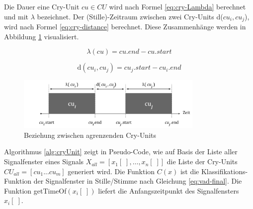 Die Dauer eine Cry-Unit $cu \in CU$ wird nach Formel \ref{eq:cry-Lambda} berechnet und mit $\lambda$ bezeichnet. Der (Stille)-Zeitraum zwischen zwei Cry-Units d($cu_i, cu_j$), wird nach Formel \ref{eq:cry-distance} berechnet. Diese Zusammenhänge werden in Abbildung \ref{img:cryUnit-details} visualisiert.\cite{vad_entropy}

\begin{equation}
\lambda (cu) = cu.end - cu.start
\label{eq:cry-Lambda}
\end{equation}

\begin{equation}
\text{d}(cu_i, cu_j) = cu_j.start - cu_i.end
\label{eq:cry-distance}
\end{equation}

\begin{figure}[h]
	\centering
	\includegraphics[width=0.8\textwidth]{bilder/newSmoothing05.png}
	\caption{Beziehung zwischen agrenzenden Cry-Units}
	\label{img:cryUnit-details}
\end{figure}

Algorithmus \ref{alg:cryUnit} zeigt in Pseudo-Code, wie auf Basis der Liste aller Signalfenster eines Signals $X_{all} = [x_1[\;] ,\ldots, x_n[\;]]$ die Liste der Cry-Units $CU_{all} = [cu_1 ... cu_m]$ generiert wird. Die Funktion $C(x)$ ist die Klassifikations-Funktion der Signalfenster in Stille/Stimme nach Gleichung \ref{eq:vad-final}. Die Funktion getTimeOf$(x_i[\;])$ liefert die Anfangszeitpunkt des Signalfensters $x_i[\;]$.

